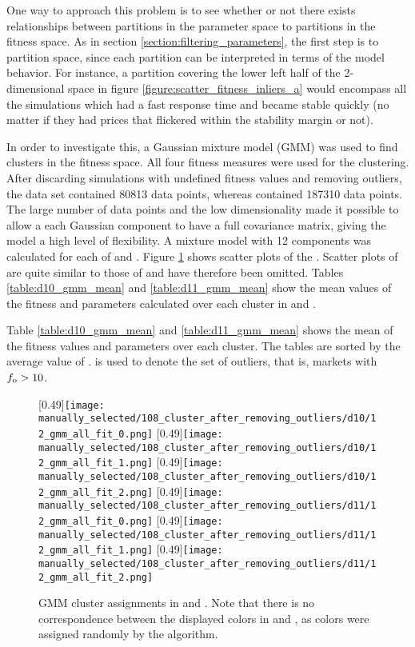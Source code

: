 One way to approach this problem is to see whether or not there exists relationships between partitions in the parameter space to partitions in the fitness space. As in section \ref{section:filtering_parameters}, the first step is to partition space, since each partition can be interpreted in terms of the model behavior. For instance, a partition covering the lower left half of the 2-dimensional space in figure \ref{figure:scatter_fitness_inliers_a} would encompass all the simulations which had a fast response time and became stable quickly (no matter if they had prices that flickered within the stability margin or not).

In order to investigate this, a Gaussian mixture model (GMM) was used to find clusters in the fitness space. All four fitness measures were used for the clustering. After discarding simulations with undefined fitness values and removing outliers, the data set \dten{} contained 80813 data points, whereas \deleven{} contained 187310 data points. The large number of data points and the low dimensionality made it possible to allow a each Gaussian component to have a full covariance matrix, giving the model a high level of flexibility. A mixture model with 12 components was calculated for each of \dten{} and \deleven. Figure \ref{fig:d10_scatter_clusters} shows scatter plots of the . Scatter plots of \deleven{} are quite similar to those of \dten{} and have therefore been omitted. Tables \ref{table:d10_gmm_mean} and \ref{table:d11_gmm_mean} show the mean values of the fitness and parameters calculated over each cluster in \dten{} and \deleven. 

Table \ref{table:d10_gmm_mean} and  \ref{table:d11_gmm_mean} shows the mean of the fitness values and parameters over each cluster. The tables are sorted by the average value of \overshoot. \outliers{} is used to denote the set of outliers, that is, markets with $f_\text{o} > 10$.


\begin{figure}
	\centering
	\subcaptionbox{\dten}[0.49\linewidth]{\texttt{[image: manually\_selected/108\_cluster\_after\_removing\_outliers/d10/12\_gmm\_all\_fit\_0.png]}}
	\subcaptionbox{\dten}[0.49\linewidth]{\texttt{[image: manually\_selected/108\_cluster\_after\_removing\_outliers/d10/12\_gmm\_all\_fit\_1.png]}}
	\subcaptionbox{\dten}[0.49\linewidth]{\texttt{[image: manually\_selected/108\_cluster\_after\_removing\_outliers/d10/12\_gmm\_all\_fit\_2.png]}}
	\subcaptionbox{\deleven}[0.49\linewidth]{\texttt{[image: manually\_selected/108\_cluster\_after\_removing\_outliers/d11/12\_gmm\_all\_fit\_0.png]}}
	\subcaptionbox{\deleven}[0.49\linewidth]{\texttt{[image: manually\_selected/108\_cluster\_after\_removing\_outliers/d11/12\_gmm\_all\_fit\_1.png]}}
	\subcaptionbox{\deleven}[0.49\linewidth]{\texttt{[image: manually\_selected/108\_cluster\_after\_removing\_outliers/d11/12\_gmm\_all\_fit\_2.png]}}
	\caption{GMM cluster assignments in \dten{} and \deleven. Note that there is no correspondence between the displayed colors in \dten{} and \deleven, as colors were assigned randomly by the algorithm.}
	\label{fig:d10_scatter_clusters}
\end{figure}





